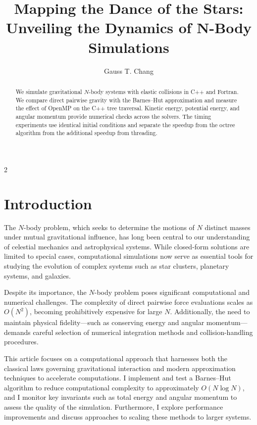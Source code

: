 \documentclass[a4paper, 12pt, oneside, onecolumn]{article}
\title{Mapping the Dance of the Stars:\\Unveiling the Dynamics of N-Body Simulations}
\author[$^\dagger$]{Gauss T. Chang}
\affil[$^\dagger$]{\textit{Department of Physics, National Taiwan University, Taipei, Taiwan}\\\texttt{b09501028@ntu.edu.tw}}
\date{\DTMdate{2024-12-17}}
\begin{document}
\maketitle

\begin{abstract}
We simulate gravitational $N$-body systems with elastic collisions in C++ and Fortran. We compare direct pairwise gravity with the Barnes--Hut approximation and measure the effect of OpenMP on the C++ tree traversal. Kinetic energy, potential energy, and angular momentum provide numerical checks across the solvers. The timing experiments use identical initial conditions and separate the speedup from the octree algorithm from the additional speedup from threading.
\end{abstract}
\begin{multicols}{2}


\section{Introduction}

The $N$-body problem, which seeks to determine the motions of $N$ distinct masses under mutual gravitational influence, has long been central to our understanding of celestial mechanics and astrophysical systems. While closed-form solutions are limited to special cases, computational simulations now serve as essential tools for studying the evolution of complex systems such as star clusters, planetary systems, and galaxies.

Despite its importance, the $N$-body problem poses significant computational and numerical challenges. The complexity of direct pairwise force evaluations scales as $O(N^2)$, becoming prohibitively expensive for large $N$. Additionally, the need to maintain physical fidelity—such as conserving energy and angular momentum—demands careful selection of numerical integration methods and collision-handling procedures.

This article focuses on a computational approach that harnesses both the classical laws governing gravitational interaction and modern approximation techniques to accelerate computations. I implement and test a Barnes–Hut algorithm to reduce computational complexity to approximately $O(N \log N)$, and I monitor key invariants such as total energy and angular momentum to assess the quality of the simulation. Furthermore, I explore performance improvements and discuss approaches to scaling these methods to larger systems.


\end{multicols}
\end{document}
